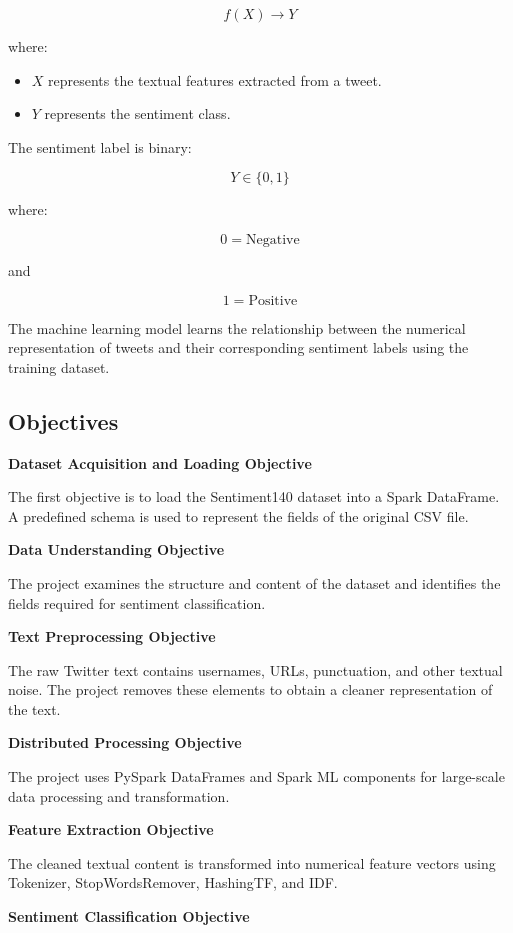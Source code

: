 \documentclass[12pt,a4paper]{article}
\begin{document}
\[
f(X) \rightarrow Y
\]

where:

\begin{itemize}
    \item $X$ represents the textual features extracted from a tweet.
    \item $Y$ represents the sentiment class.
\end{itemize}

The sentiment label is binary:

\[
Y \in \{0,1\}
\]

where:

\[
0 = \text{Negative}
\]

and

\[
1 = \text{Positive}
\]

The machine learning model learns the relationship between the numerical representation of tweets and their corresponding sentiment labels using the training dataset.

\subsection{Objectives}

\textbf{Dataset Acquisition and Loading Objective}

The first objective is to load the Sentiment140 dataset into a Spark DataFrame. A predefined schema is used to represent the fields of the original CSV file.

\textbf{Data Understanding Objective}

The project examines the structure and content of the dataset and identifies the fields required for sentiment classification.

\textbf{Text Preprocessing Objective}

The raw Twitter text contains usernames, URLs, punctuation, and other textual noise. The project removes these elements to obtain a cleaner representation of the text.

\textbf{Distributed Processing Objective}

The project uses PySpark DataFrames and Spark ML components for large-scale data processing and transformation.

\textbf{Feature Extraction Objective}

The cleaned textual content is transformed into numerical feature vectors using Tokenizer, StopWordsRemover, HashingTF, and IDF.

\textbf{Sentiment Classification Objective}
\end{document}
